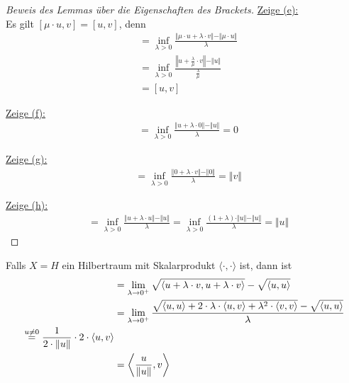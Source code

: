 \begin{proof}[Beweis des Lemmas über die Eigenschaften des Brackets]
\underline{Zeige (e):}\\
Es gilt $[\mu\cdot u,v]=[u,v]$, denn
\begin{align*}
[\mu\cdot u,v]
&=
\inf\limits_{\lambda>0}\frac{\Vert\mu\cdot u+\lambda\cdot v\Vert-\Vert\mu\cdot u\Vert}{\lambda}\\
&=\inf\limits_{\lambda>0}\frac{\left\Vert u+\frac{\lambda}{\mu}\cdot v\right\Vert-\Vert u\Vert}{\frac{\lambda}{\mu}}\\
&=
[u,v]
\end{align*}

\underline{Zeige (f):}
\begin{align*}
[u,0]
&=
\inf\limits_{\lambda>0}\frac{\Vert u+\lambda\cdot0\Vert-\Vert u\Vert}{\lambda}
=0
\end{align*}

\underline{Zeige (g):}
\begin{align*}
[0,v]
&=
\inf\limits_{\lambda>0}\frac{\Vert 0+\lambda\cdot v\Vert-\Vert 0\Vert}{\lambda}
=\Vert v\Vert
\end{align*}

\underline{Zeige (h):}
\begin{align*}
[u,u]
&=
\inf\limits_{\lambda>0}\frac{\Vert u+\lambda\cdot u\Vert-\Vert u\Vert}{\lambda}
=
\inf\limits_{\lambda>0}\frac{(1+\lambda)\cdot\Vert u\Vert-\Vert u\Vert}{\lambda}
=\Vert u\Vert
\end{align*}
\end{proof}

\begin{bemerkung}
Falls $X=H$ ein Hilbertraum mit Skalarprodukt $\langle\cdot,\cdot\rangle$ ist, dann ist
\begin{align*}
[u,v] 
&=
\lim\limits_{\lambda\to0^+}\sqrt{\langle u+\lambda\cdot v,u+\lambda\cdot v\rangle}-\sqrt{\langle u,u\rangle}\\
&=\lim\limits_{\lambda\to0^+}\frac{\sqrt{\langle u,u\rangle+2\cdot\lambda\cdot\langle u,v\rangle+\lambda^2\cdot\langle v,v\rangle}-\sqrt{\langle u,u\rangle}}{\lambda}\\
\stackeq{u\neq0}
\frac{1}{2\cdot\Vert u\Vert}\cdot 2\cdot\langle u,v\rangle\\
&=\left\langle\frac{u}{\Vert u\Vert},v\right\rangle
\end{align*}
\end{bemerkung}

